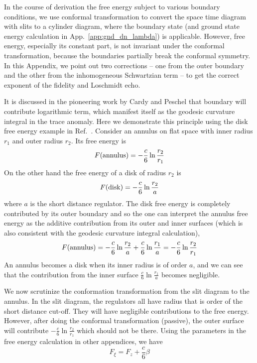 
In the course of derivation the free energy subject to various boundary conditions, we use conformal transformation to convert the space time diagram with slits to a cylinder diagram, where the boundary state (and ground state energy calculation in App.~\ref{app:gnd_dn_lambda}) is applicable. However, free energy, especially its constant part, is not invariant under the conformal transformation, because the boundaries partially break the conformal symmetry. In this Appendix, we point out two corrections -- one from the outer boundary and the other from the inhomogeneous Schwartzian term -- to get the correct exponent of the fidelity and Loschmidt echo. 

It is discussed in the pioneering work\cite{cardy_finite-size_1988} by Cardy and Peschel that boundary will contribute logarithmic term, which manifest itself as the geodesic curvature integral in the trace anomaly. Here we demonstrate this principle using the disk free energy example in Ref.~\cite{cardy_finite-size_1988}. Consider an annulus on flat space with inner radius $r_1$ and outer radius $r_2$. Its free energy is
\begin{equation}
F({\rm annulus}) = -  \frac{c}{6} \ln \frac{r_2}{r_1} 
\end{equation}
On the other hand the free energy of a disk of radius $r_2$ is
\begin{equation}
  F( {\rm disk} ) = - \frac{c}{6} \ln \frac{r_2}{a}
\end{equation}
where $a$ is the short distance regulator. The disk free energy is completely contributed by its outer boundary and so the one can interpret the annulus free energy as the additive contribution from its outer and inner surfaces (which is also consistent with the geodesic curvature integral calculation),
\begin{equation}
F( {\rm annulus} ) = -  \frac{c}{6} \ln \frac{r_2}{a} +  \frac{c}{6} \ln \frac{r_1}{a} = - \frac{c}{6} \ln \frac{r_2}{r_1}
\end{equation}
An annulus becomes a disk when its inner radius is of order $a$, and we can see that the contribution from the inner surface $\frac{c}{6} \ln \frac{r_1}{a}$ becomes negligible. 

We now scrutinize the conformation transformation from the slit diagram to the annulus. In the slit diagram, the regulators all have radius that is order of the short distance cut-off. They will have negligible contributions to the free energy. However, after doing the conformal transformation (passive), the outer surface will contribute $-\frac{c}{6} \ln \frac{r_2}{r_1}$ which should not be there. Using the parameters in the free energy calculation in other appendices, we have 
\begin{equation}
F_{\xi } = F_{z} + \frac{c}{6} \beta 
\end{equation}

